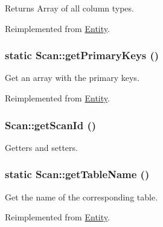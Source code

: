 \begin{DoxyReturn}{Returns}
Array of all column types. 
\end{DoxyReturn}


Reimplemented from \hyperlink{classEntity_ad69437219c10955803707fbf6ac458e7}{Entity}.

\hypertarget{classScan_a0e7fe3c9a64e4655114a82473fc78827}{
\subsubsection[{getPrimaryKeys}]{\setlength{\rightskip}{0pt plus 5cm}static Scan::getPrimaryKeys ()}}
\label{classScan_a0e7fe3c9a64e4655114a82473fc78827}
Get an array with the primary keys. 

Reimplemented from \hyperlink{classEntity_a61bbfbb4058427174e002a09ddc77c41}{Entity}.

\hypertarget{classScan_a30ad0e456f9d0f3b3b0ef028e7e36d37}{
\subsubsection[{getScanId}]{\setlength{\rightskip}{0pt plus 5cm}Scan::getScanId ()}}
\label{classScan_a30ad0e456f9d0f3b3b0ef028e7e36d37}
Getters and setters. \hypertarget{classScan_ad9ada4df484a671439f131458e22d2e0}{
\subsubsection[{getTableName}]{\setlength{\rightskip}{0pt plus 5cm}static Scan::getTableName ()}}
\label{classScan_ad9ada4df484a671439f131458e22d2e0}
Get the name of the corresponding table. 

Reimplemented from \hyperlink{classEntity_a8305fd94740ac62cbafb9de76567ce37}{Entity}.



